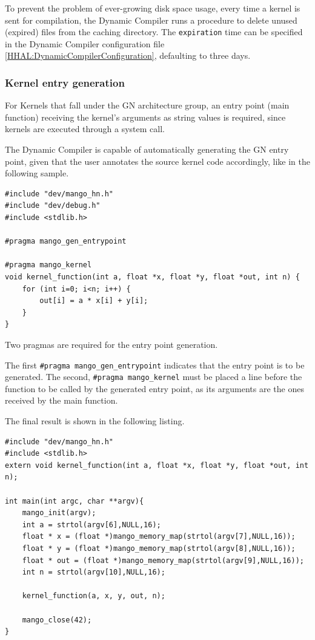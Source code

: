 To prevent the problem of ever-growing disk space usage, every time a kernel is sent for compilation, the Dynamic Compiler runs a procedure to delete unused (expired) files from the caching directory. The \texttt{expiration} time can be specified in the Dynamic Compiler configuration file \ref{HHAL:DynamicCompilerConfiguration}, defaulting to three days.

\subsubsection{Kernel entry generation}

For Kernels that fall under the GN architecture group, an entry point (main function) receiving the kernel's arguments as string values is required, since kernels are executed through a system call.

The Dynamic Compiler is capable of automatically generating the GN entry point, given that the user annotates the source kernel code accordingly, like in the following sample.

\begin{lstlisting}[style=CStyle, caption=HHAL Dynamic Compiler - Kernel source annotation sample]
#include "dev/mango_hn.h"
#include "dev/debug.h"
#include <stdlib.h>

#pragma mango_gen_entrypoint

#pragma mango_kernel
void kernel_function(int a, float *x, float *y, float *out, int n) {
    for (int i=0; i<n; i++) {
	    out[i] = a * x[i] + y[i];
    }
}
\end{lstlisting}

Two pragmas are required for the entry point generation. 

The first \texttt{\#pragma mango\_gen\_entrypoint} indicates that the entry point is to be generated. The second, \texttt{\#pragma mango\_kernel} must be placed a line before the function to be called by the generated entry point, as its arguments are the ones received by the main function.

The final result is shown in the following listing.

\begin{lstlisting}[style=CStyle, caption=HHAL Dynamic Compiler - Entrypoint generation result]
#include "dev/mango_hn.h"
#include <stdlib.h>
extern void kernel_function(int a, float *x, float *y, float *out, int n);

int main(int argc, char **argv){
	mango_init(argv);
	int a = strtol(argv[6],NULL,16);
	float * x = (float *)mango_memory_map(strtol(argv[7],NULL,16));
	float * y = (float *)mango_memory_map(strtol(argv[8],NULL,16));
	float * out = (float *)mango_memory_map(strtol(argv[9],NULL,16));
	int n = strtol(argv[10],NULL,16);

	kernel_function(a, x, y, out, n);

	mango_close(42);
}
\end{lstlisting}


